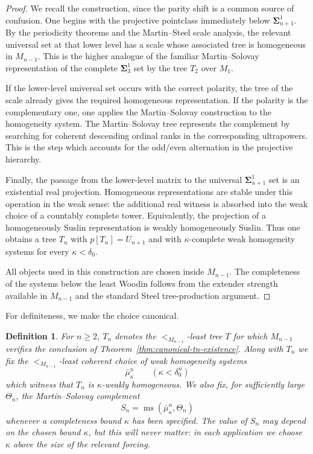 \documentclass[a4paper,11pt]{article}
\newtheorem{definition}[theorem]{Definition}
\begin{document}
\begin{proof}
We recall the construction, since the parity shift is a common source of confusion.  One begins with the projective pointclass immediately below $\boldsymbol{\Sigma}^1_{n+1}$.  By the periodicity theorems and the Martin--Steel scale analysis, the relevant universal set at that lower level has a scale whose associated tree is homogeneous in $M_{n-1}$.  This is the higher analogue of the familiar Martin--Solovay representation of the complete $\boldsymbol{\Sigma}^1_3$ set by the tree $T_2$ over $M_1$.

If the lower-level universal set occurs with the correct polarity, the tree of the scale already gives the required homogeneous representation.  If the polarity is the complementary one, one applies the Martin--Solovay construction to the homogeneity system.  The Martin--Solovay tree represents the complement by searching for coherent descending ordinal ranks in the corresponding ultrapowers.  This is the step which accounts for the odd/even alternation in the projective hierarchy.

Finally, the passage from the lower-level matrix to the universal $\boldsymbol{\Sigma}^1_{n+1}$ set is an existential real projection.  Homogeneous representations are stable under this operation in the weak sense: the additional real witness is absorbed into the weak choice of a countably complete tower.  Equivalently, the projection of a homogeneously Suslin representation is weakly homogeneously Suslin.  Thus one obtains a tree $T_n$ with $p[T_n]=U_{n+1}$ and with $\kappa$-complete weak homogeneity systems for every $\kappa<\delta_0$.

All objects used in this construction are chosen inside $M_{n-1}$.  The completeness of the systems below the least Woodin follows from the extender strength available in $M_{n-1}$ and the standard Steel tree-production argument.
\end{proof}

For definiteness, we make the choice canonical.

\begin{definition}\label{def:canonical-tn}
For $n\geq 2$, $T_n$ denotes the $<_{M_{n-1}}$-least tree $T$ for which $M_{n-1}$ verifies the conclusion of Theorem~\ref{thm:canonical-tn-existence}.  Along with $T_n$ we fix the $<_{M_{n-1}}$-least coherent choice of weak homogeneity systems
\[
   \bar\mu^n_\kappa
   \qquad (\kappa<\delta^n_0)
\]
which witness that $T_n$ is $\kappa$-weakly homogeneous.  We also fix, for sufficiently large $\Theta_n$, the Martin--Solovay complement
\[
   S_n=\operatorname{ms}(\bar\mu^n_\kappa,\Theta_n)
\]
whenever a completeness bound $\kappa$ has been specified.  The value of $S_n$ may depend on the chosen bound $\kappa$, but this will never matter: in each application we choose $\kappa$ above the size of the relevant forcing.
\end{definition}
\end{document}
